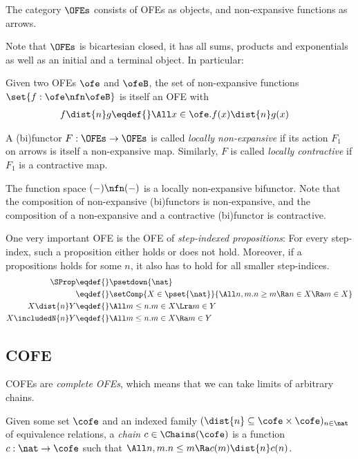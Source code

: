 \begin{defn}
  The category $\OFEs$ consists of OFEs as objects, and non-expansive functions as arrows.
\end{defn}

Note that $\OFEs$ is bicartesian closed, \ie it has all sums, products and exponentials as well as an initial and a terminal object.
In particular:
\begin{defn}
  Given two OFEs $\ofe$ and $\ofeB$, the set of non-expansive functions $\set{f : \ofe \nfn \ofeB}$ is itself an OFE with
  \begin{align*}
    f \dist{n} g \eqdef{}& \All x \in \ofe. f(x) \dist{n} g(x)
  \end{align*}
\end{defn}

\begin{defn}
  A (bi)functor $F : \OFEs \to \OFEs$ is called \emph{locally non-expansive} if its action $F_1$ on arrows is itself a non-expansive map.
  Similarly, $F$ is called \emph{locally contractive} if $F_1$ is a contractive map.
\end{defn}
The function space $(-) \nfn (-)$ is a locally non-expansive bifunctor.
Note that the composition of non-expansive (bi)functors is non-expansive, and the composition of a non-expansive and a contractive (bi)functor is contractive.

One very important OFE is the OFE of \emph{step-indexed propositions}:
For every step-index, such a proposition either holds or does not hold.
Moreover, if a propositions holds for some $n$, it also has to hold for all smaller step-indices.
\begin{align*}
  \SProp \eqdef{}& \psetdown{\nat} \\
    \eqdef{}& \setComp{X \in \pset{\nat}}{ \All n, m. n \geq m \Ra n \in X \Ra m \in X } \\
  X \dist{n} Y \eqdef{}& \All m \leq n. m \in X \Lra m \in Y \\
  X \includedN{n} Y \eqdef{}& \All m \leq n. m \in X \Ra m \in Y
\end{align*}

\subsection{COFE}

COFEs are \emph{complete OFEs}, which means that we can take limits of arbitrary chains.

\begin{defn}[Chain]
  Given some set $\cofe$ and an indexed family $({\dist{n}} \subseteq \cofe \times \cofe)_{n \in \nat}$ of equivalence relations, a \emph{chain} $c \in \Chains(\cofe)$ is a function $c : \nat \to \cofe$ such that $\All n, m. n \leq m \Ra c (m) \dist{n} c (n)$.
\end{defn}


